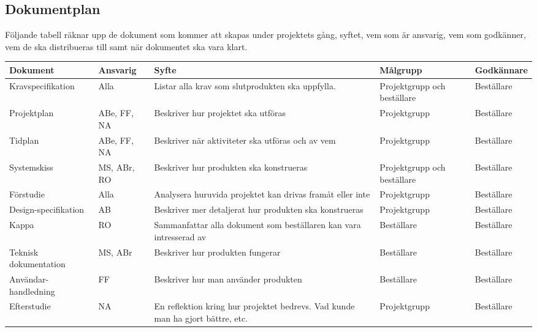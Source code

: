 \documentclass[11pt]{article}
\begin{document}
\begin{flushleft}

\pagebreak

\section{Dokumentplan}
Följande tabell räknar upp de dokument som kommer att skapas under projektets gång, syftet, vem som är ansvarig, vem som godkänner, vem de ska distribueras till samt när dokumentet ska vara klart.
\begin{center}
\begin{longtable}{|p{.28\linewidth}|p{.1\linewidth}|p{.25\linewidth}|p{.19\linewidth}|p{.15\linewidth}|}\hline
\textbf{Dokument} & \textbf{Ansvarig} & \textbf{Syfte} & \textbf{Målgrupp} & \textbf{Godkännare} \\ \hline

Kravspecifikation & Alla & Listar alla krav som slutprodukten ska uppfylla. & Projektgrupp och beställare & Beställare \\ \hline
Projektplan & ABe, FF, NA & Beskriver hur projektet ska utföras & Projektgrupp & Beställare \\ \hline
Tidplan & ABe, FF, NA & Beskriver när aktiviteter ska utföras och av vem & Projektgrupp & Beställare \\ \hline
Systemskiss & MS, ABr, RO & Beskriver hur produkten ska konstrueras& Projektgrupp och beställare & Beställare \\ \hline
Förstudie & Alla & Analysera huruvida projektet kan drivas framåt eller inte & Projektgrupp & Beställare \\ \hline
Design-specifikation & AB & Beskriver mer detaljerat hur produkten ska konstrueras & Projektgrupp & Beställare \\ \hline
Kappa & RO & Sammanfattar alla dokument som beställaren kan vara intresserad av & Beställare & Beställare \\ \hline
Teknisk dokumentation & MS, ABr & Beskriver hur produkten fungerar & Beställare & Beställare \\ \hline
Användar-handledning & FF & Beskriver hur man använder produkten& Beställare & Beställare \\ \hline
Efterstudie & NA & En reflektion kring hur projektet bedrevs. Vad kunde man ha gjort bättre, etc.& Projektgrupp & Beställare\\ \hline


\end{longtable}
\end{center}
\end{flushleft}
\end{document}
